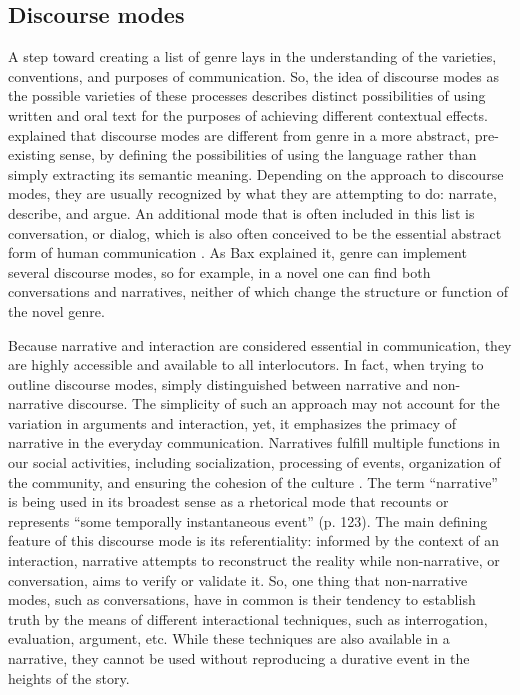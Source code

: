 \documentclass[12pt, draft]{article}
\begin{document}
\subsection{Discourse modes}
A step toward creating a list of genre lays in the understanding of the varieties, conventions, and purposes of communication. So, the idea of discourse modes as the possible varieties of these processes describes distinct possibilities of using written and oral text for the purposes of achieving different contextual effects. \textcite[p. 54]{bax2011} explained that discourse modes are different from genre in a more abstract, pre-existing sense, by defining the possibilities of using the language rather than simply extracting its semantic meaning. Depending on the approach to discourse modes, they are usually recognized by what they are attempting to do: narrate, describe, and argue. An additional mode that is often included in this list is conversation, or dialog, which is also often conceived to be the essential abstract form of human communication \parencite{bakhtin1986, bax2011}. As Bax explained it, genre can implement several discourse modes, so for example, in a novel one can find both conversations and narratives, neither of which change the structure or function of the novel genre.

Because narrative and interaction are considered essential in communication, they are highly accessible and available to all interlocutors.  In fact, when trying to outline discourse modes, \textcite{georgakopoulou2000} simply distinguished between narrative and non-narrative discourse. The simplicity of such an approach may not account for the variation in arguments and interaction, yet, it emphasizes the primacy of narrative in the everyday communication. Narratives fulfill multiple functions in our social activities, including socialization, processing of events, organization of the community, and ensuring the cohesion of the culture \parencite{georgakopoulou2000}. The term ``narrative'' is being used in its broadest sense as a rhetorical mode that recounts or represents ``some temporally instantaneous event'' (p. 123). The main defining feature of this discourse mode is its referentiality: informed by the context of an interaction, narrative attempts to reconstruct the reality while non-narrative, or conversation, aims to verify or validate it. So, one thing that non-narrative modes, such as conversations, have in common is their tendency to establish truth by the means of different interactional techniques, such as interrogation, evaluation, argument, etc. While these techniques are also available in a narrative, they cannot be used without reproducing a durative event in the heights of the story. 
\end{document}
